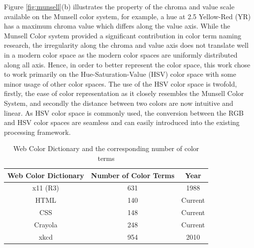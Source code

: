 Figure \ref{fig:munsell}(b) illustrates the property of the chroma and value scale available on the Munsell color system, for example, a hue at 2.5 Yellow-Red (YR) has a maximum chroma value which differs along the value axis. While the Munsell Color system provided a significant contribution in color term naming research, the irregularity along the chroma and value axis does not translate well in a modern color space as the modern color spaces are uniformly distributed along all axis. Hence, in order to better represent the color space, this work chose to work primarily on the Hue-Saturation-Value (HSV) color space with some minor usage of other color spaces. The use of the HSV color space is twofold, firstly, the ease of color representation as it closely resembles the Munsell Color System, and secondly the distance between two colors are now intuitive and linear. As HSV color space is commonly used, the conversion between the RGB and HSV color spaces are seamless and can easily introduced into the existing processing framework. 

\begin{table}[]
\centering
\begin{tabular}{|c|c|c|}
\hline
\multicolumn{1}{|c|}{\textbf{Web Color Dictionary}} & \multicolumn{1}{c|}{\textbf{Number of Color Terms}} & \multicolumn{1}{c|}{\textbf{Year}} \\ \hline
x11 (R3)                                            & 631                                                 & 1988                               \\ \hline
HTML                                                & 140                                                 & Current                            \\ \hline
CSS                                                 & 148                                                 & Current                            \\ \hline
Crayola                                             & 248                                                 & Current                            \\ \hline
xkcd                                                & 954                                                 & 2010                               \\ \hline
\end{tabular}
\caption{Web Color Dictionary and the corresponding number of color terms}
\label{table:allcolorterms}
\end{table}




